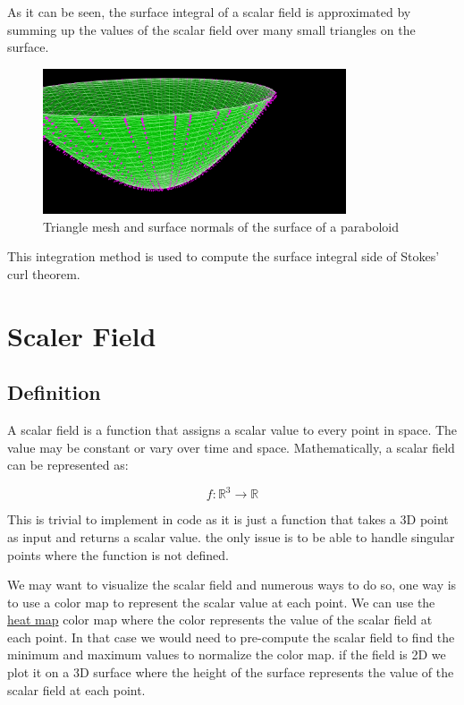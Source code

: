 \documentclass[12pt]{article}
\begin{document}
As it can be seen, the surface integral of a scalar field is approximated by summing up the values of the scalar field over many small triangles on the surface.

\begin{figure}[H]
    \centering
    \includegraphics[width=0.8\textwidth]{images/surface.png}
    \caption{Triangle mesh and surface normals of the surface of a paraboloid\cite{El-Deeb_PEU-218_Stokes_Threejs}}
\end{figure}

This integration method is used to compute the surface integral side of Stokes' curl theorem.

\newpage
\section{Scaler Field}
\subsection{Definition}

A scalar field is a function that assigns a scalar value to every point in space. The value may be constant or vary over time and space. Mathematically, a scalar field can be represented as:

\[
    f: \mathbb{R}^3 \rightarrow \mathbb{R}
\]

This is trivial to implement in code as it is just a function that takes a 3D point as input and returns a scalar value.
the only issue is to be able to handle singular points where the function is not defined.

We may want to visualize the scalar field and numerous ways to do so, one way is to use a color map to represent the scalar value at each point. We can use the \href{https://en.wikipedia.org/wiki/Heat_map}{heat map} color map where the color represents the value of the scalar field at each point.
In that case we would need to pre-compute the scalar field to find the minimum and maximum values to normalize the color map. if the field is 2D we plot it on a 3D surface where the height of the surface represents the value of the scalar field at each point.
\end{document}
